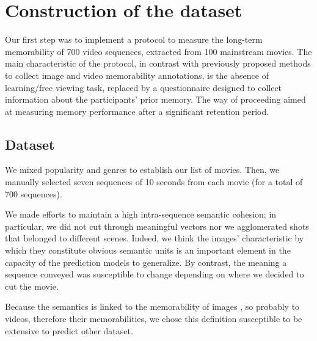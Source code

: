 \documentclass[sigconf]{acmart}
\begin{document}

\section{Construction of the dataset}
Our first step was to implement a protocol to measure the long-term memorability of 700 video sequences, extracted from 100 mainstream movies.
The main characteristic of the protocol, in contrast with previously proposed methods to collect image and video memorability annotations, is the absence of learning/free viewing task, replaced by a questionnaire designed to collect information about the participants' prior memory.
The way of proceeding aimed at measuring memory performance after a significant retention period.

\subsection{Dataset}
We mixed popularity and genres to establish our list of movies.%
Then, we manually selected seven sequences of 10 seconds from each movie (for a total of 700 sequences). %

We made efforts to maintain a high intra-sequence semantic cohesion; in particular, we did not cut through meaningful vectors nor we agglomerated shots that belonged to different scenes.
Indeed, we think the images' characteristic by which they constitute obvious semantic units is an important element in the capacity of the prediction models to generalize.
By contrast, the meaning a sequence conveyed was susceptible to change depending on where we decided to cut the movie.


Because the semantics is linked to the memorability of images \cite{isola_2014_makes}, so probably to videos, therefore their memorabilities, we chose this definition susceptible to be extensive to predict other dataset.
\end{document}
